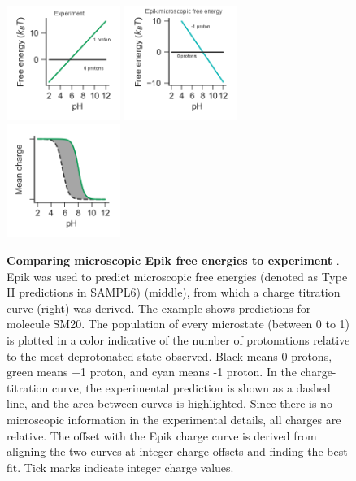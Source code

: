 \documentclass[9pt,lineno,final]{elife}
\begin{document}
\begin{figure}[H]
	\centering
	\includegraphics[width=0.33\textwidth]{Reports/Experiment-free-energy-SM20-titled.png}
	\includegraphics[width=0.33\textwidth]{Reports/Epik-TypeII-free-energy-SM20-titled.png}
	\includegraphics[width=0.33\textwidth]{Reports/Epik-TypeII-virtual-titration-SM20.png}
		\caption{{\bf Comparing microscopic Epik free energies to experiment} . Epik was used to predict microscopic free energies (denoted as Type II predictions in SAMPL6) (middle), from which a charge titration curve (right) was derived. The example shows predictions for molecule SM20. The population of every microstate (between 0 to 1) is plotted in a color indicative of the number of protonations relative to the most deprotonated state observed. Black means 0 protons, green means +1 proton, and cyan means -1 proton. In the charge-titration curve, the experimental prediction is shown as a dashed line, and the area between curves is highlighted. Since there is no microscopic information in the experimental details, all charges are relative. The offset with the Epik charge curve is derived from aligning the two curves at integer charge offsets and finding the best fit. Tick marks indicate integer charge values.  
	\label{fig:epikii-prediction}}
\end{figure}
\end{document}
